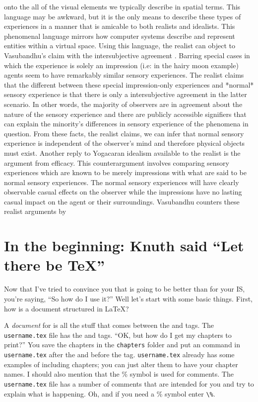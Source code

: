 onto the all of the visual elements we typically describe in spatial terms. This language may be awkward, but it is the only means to describe these types of experiences in a manner that is amicable to both realists and idealists. This phenomenal language mirrors how computer systems describe and represent entities within a virtual space. Using this language, the realist can object to Vasubandhu's claim with the intersubjective agreement \cite{siderits2007buddhism}. Barring special cases in which the experience is solely an impression (i.e: in the hairy moon example) agents seem to have remarkably similar sensory experiences. The realist claims that the different between these special impression-only experiences and *normal* sensory experience is that there is only a intersubjective agreement in the latter scenario. In other words, the majority of observers are in agreement about the nature of the sensory experience and there are publicly accessible signifiers that can explain the minority's differences in sensory experience of the phenomena in question. From these facts, the realist claims, we can infer that normal sensory experience is independent of the observer's mind and therefore physical objects must exist. Another reply to Yogacaran idealism available to the realist is the argument from efficacy. This counterargument involves comparing sensory experiences which are known to be merely impressions with what are said to be normal sensory experiences. The normal sensory experiences will have clearly observable casual effects on the observer while the impressions have no lasting casual impact on the agent or their surroundings. Vasubandhu counters these realist arguments by
\chapter{In the beginning: Knuth said ``Let there be \TeX''}\label{text}
Now that I've tried to convince you that \lt is going to be better than \msw for your IS, you're saying, ``So how do I use it?'' Well let's start with some basic things. First, how is a document structured in \LaTeX?

A \emph{document} for \lt is all the stuff that comes between the \verb|| and \verb|| tags. The\verb| username.tex| file has the \verb|| and \verb|| tags. ``OK, but how do I get my chapters to print?'' You save the chapters in the \verb|chapters| folder and put an \verb|| command in \verb|username.tex| after the \verb|| and before the
\verb|| tag. \verb|username.tex| already has some examples of including chapters; you can just alter them to have your chapter names. I should also mention that the \% symbol is used for comments. The \verb|username.tex| file has a number of comments that are intended for you and try to explain what is happening. Oh, and if you need a \% symbol enter \verb+\%+.

